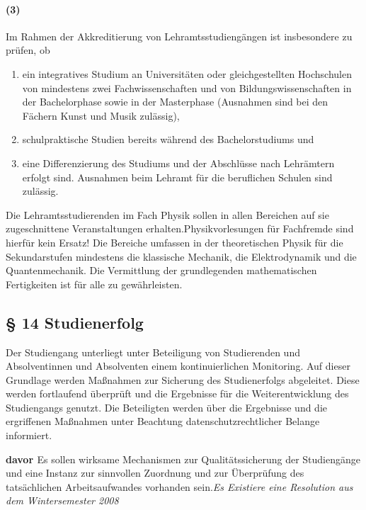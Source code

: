 \documentclass[a4paper]{scrartcl}
\begin{document}
\paragraph{(3)} Im Rahmen der Akkreditierung von Lehramtsstudiengängen ist insbesondere zu prüfen, ob
\begin{enumerate}
\item ein integratives Studium an Universitäten oder gleichgestellten
Hochschulen von mindestens zwei Fachwissenschaften und von Bildungswissenschaften in der Bachelorphase sowie in der Masterphase (Ausnahmen sind bei den Fächern Kunst und Musik zulässig),
\item schulpraktische Studien bereits während des Bachelorstudiums und
\item eine Differenzierung des Studiums und der Abschlüsse nach Lehrämtern erfolgt sind. Ausnahmen beim Lehramt für die beruflichen Schulen sind zulässig.
\end{enumerate}

\textcolor{Bernd}{\textbf{\cite{RESO: WiSe2008-Lehramt}} Die Lehramtsstudierenden im Fach Physik sollen in allen Bereichen auf sie zugeschnittene Veranstaltungen erhalten.Physikvorlesungen für Fachfremde sind hierfür kein Ersatz! Die Bereiche umfassen in der theoretischen Physik für die Sekundarstufen mindestens die klassische Mechanik, die Elektrodynamik und die Quantenmechanik. Die Vermittlung der grundlegenden mathematischen Fertigkeiten ist für alle zu gewährleisten.}

\subsection{§ 14 Studienerfolg}
Der Studiengang unterliegt unter Beteiligung von Studierenden und Absolventinnen und Absolventen einem kontinuierlichen Monitoring. Auf dieser Grundlage werden Maßnahmen zur Sicherung des Studienerfolgs abgeleitet. Diese werden fortlaufend überprüft und die Ergebnisse für die Weiterentwicklung des Studiengangs genutzt. Die Beteiligten werden über die Ergebnisse und die ergriffenen Maßnahmen unter Beachtung datenschutzrechtlicher Belange informiert.

\textcolor{Bernd}{\textbf{\cite{RESO: SoSe2010-BaMa} davor \cite{RESO: WiSe2008}} Es sollen wirksame Mechanismen zur Qualitätssicherung der Studiengänge und eine Instanz zur sinnvollen Zuordnung und zur Überprüfung des tatsächlichen Arbeitsaufwandes vorhanden sein.}\textcolor{Brutus}{\emph{Es Existiere eine Resolution aus dem Wintersemester 2008}}\\
\end{document}
